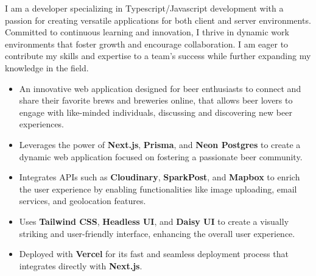 \documentclass[9pt,a4paper,withhyper]{altacv}
\begin{document}

\makecvheader
{}

\begin{paracol}{2}
  I am a developer specializing in Typescript/Javascript development with a passion for creating versatile applications for both client and server environments. Committed to continuous learning and innovation, I thrive in dynamic work environments that foster growth and encourage collaboration. I am eager to contribute my skills and expertise to a team's success while further expanding my knowledge in the field.

  \begin{itemize}
	\item An innovative web application designed for beer enthusiasts to connect and share their favorite brews and breweries online, that allows beer lovers to engage with like-minded individuals, discussing and discovering new beer experiences.
    \item Leverages the power of \textbf{Next.js}, \textbf{Prisma}, and \textbf{Neon Postgres} to create a dynamic web application focused on fostering a passionate beer community.
    \item Integrates APIs such as \textbf{Cloudinary}, \textbf{SparkPost}, and \textbf{Mapbox} to enrich the user experience by enabling functionalities like image uploading, email services, and geolocation features.
    \item Uses \textbf{Tailwind CSS}, \textbf{Headless UI}, and \textbf{Daisy UI} to create a visually striking and user-friendly interface, enhancing the overall user experience.
    \item Deployed with \textbf{Vercel} for its fast and seamless deployment process that integrates directly with \textbf{Next.js}.
  \end{itemize}

  \divider


\end{paracol}
\end{document}
